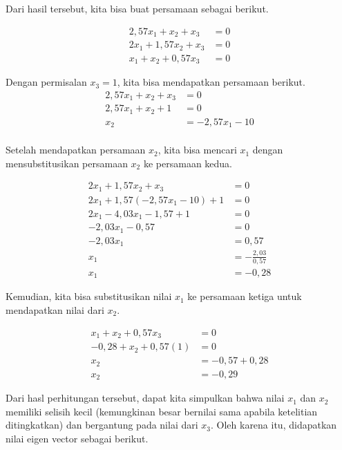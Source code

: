 \documentclass{article}
\begin{document}
\setcounter{equation}{0}

Dari hasil tersebut, kita bisa buat persamaan sebagai berikut.

\begin{align}
    2,57x_1 + x_2 + x_3 &= 0\\
    2x_1 + 1,57x_2 + x_3 &= 0\\
    x_1 + x_2 +0,57x_3 &= 0
\end{align}

Dengan permisalan $x_3 = 1$, kita bisa mendapatkan persamaan berikut.
\begin{align*}
    2,57x_1 + x_2 + x_3 &= 0\\
    2,57x_1 + x_2 + 1 &= 0\\
    x_2 &= - 2,57x_1 - 1 0\\    
\end{align*}

Setelah mendapatkan persamaan $x_2$, kita bisa mencari $x_1$ dengan mensubstitusikan persamaan $x_2$ ke persamaan kedua.

\begin{align*}
    2x_1 + 1,57x_2 + x_3 &= 0\\
    2x_1 + 1,57(- 2,57x_1 - 1 0) + 1 &= 0\\
    2x_1  - 4,03x_1 - 1,57 + 1 &= 0\\
    -2,03x_1 - 0,57 &= 0\\
    -2,03x_1 &= 0,57\\
    x_1 &= -\frac{2,03}{0,57}\\
    x_1 &= -0,28
\end{align*}

Kemudian, kita bisa substitusikan nilai $x_1$ ke persamaan ketiga untuk mendapatkan nilai dari $x_2$.

\begin{align*}
    x_1 + x_2 +0,57x_3 &= 0\\
    -0,28 + x_2 + 0,57(1) &= 0\\
    x_2 &= -0,57 + 0,28\\
    x_2 &= -0,29
\end{align*}

Dari hasl perhitungan tersebut, dapat kita simpulkan bahwa nilai $x_1$ dan $x_2$ memiliki selisih kecil (kemungkinan besar bernilai sama apabila ketelitian ditingkatkan) dan bergantung pada nilai dari $x_3$. Oleh karena itu, didapatkan nilai eigen vector sebagai berikut.
\end{document}
